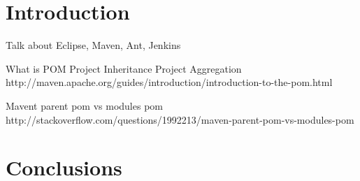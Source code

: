 \documentclass[12pt]{article}
\begin{document}
\maketitle
\section{Introduction}
Talk about Eclipse, Maven, Ant, Jenkins

What is POM
Project Inheritance
Project Aggregation
http://maven.apache.org/guides/introduction/introduction-to-the-pom.html

Mavent parent pom vs modules pom
http://stackoverflow.com/questions/1992213/maven-parent-pom-vs-modules-pom

\section{Conclusions}
\end{document}
